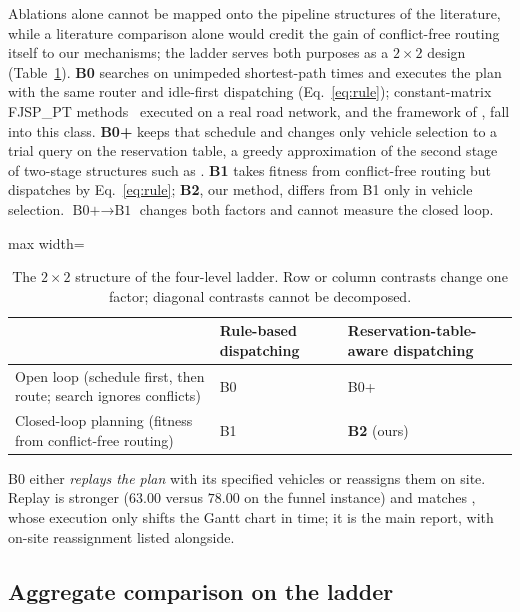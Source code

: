 \documentclass[preprint,review,12pt,authoryear]{elsarticle}
\begin{document}
Ablations alone cannot be mapped onto the pipeline structures of the literature, while a literature comparison alone would credit the gain of conflict-free routing itself to our mechanisms; the ladder serves both purposes as a $2\times2$ design (Table~\ref{tab:arms}).
\textbf{B0} searches on unimpeded shortest-path times and executes the plan with the same router and idle-first dispatching (Eq.~\eqref{eq:rule}); constant-matrix FJSP\_PT methods~\citep{meng2025cp,qin2026knowledge,jafarian2026integrated} executed on a real road network, and the framework of \citet{li2026framework}, fall into this class.
\textbf{B0+} keeps that schedule and changes only vehicle selection to a trial query on the reservation table, a greedy approximation of the second stage of two-stage structures such as \citet{sun2023integrated}.
\textbf{B1} takes fitness from conflict-free routing but dispatches by Eq.~\eqref{eq:rule}; \textbf{B2}, our method, differs from B1 only in vehicle selection.
$\text{B0+}\to\text{B1}$ changes both factors and cannot measure the closed loop.

\begin{table}[!htbp]
\caption{The $2\times2$ structure of the four-level ladder. Row or column contrasts change one factor; diagonal contrasts cannot be decomposed.}
\label{tab:arms}
\footnotesize
\begin{adjustbox}{max width=\linewidth}\begin{tabular}{@{}>{\raggedright\arraybackslash}p{6.4cm}>{\centering\arraybackslash}p{2.6cm}>{\centering\arraybackslash}p{3.2cm}@{}}
\toprule
 & Rule-based dispatching & Reservation-table-aware dispatching \\
\midrule
Open loop (schedule first, then route; search ignores conflicts) & B0 & B0+ \\
Closed-loop planning (fitness from conflict-free routing) & B1 & \textbf{B2} (ours) \\
\bottomrule
\end{tabular}\end{adjustbox}
\end{table}

B0 either \emph{replays the plan} with its specified vehicles or reassigns them on site. Replay is stronger ($63.00$ versus $78.00$ on the funnel instance) and matches \citet{li2026framework}, whose execution only shifts the Gantt chart in time; it is the main report, with on-site reassignment listed alongside.

\subsection{Aggregate comparison on the ladder}
\label{sec:main}
\end{document}
